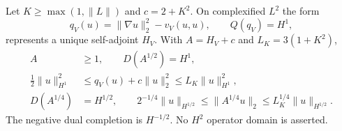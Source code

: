 \begin{proposition}
  \label{P:signed-closed-form}
  Let $K\ge\max(1,\|L\|)$ and $c=2+K^2$.
  On complexified $L^2$ the form
  \[
    q_V(u)=\|\nabla u\|_2^2-v_V(u,u),\qquad Q(q_V)=H^1,
  \]
  represents a unique self-adjoint $H_V$.
  With $A=H_V+c$ and $L_K=3(1+K^2)$,
  \begin{align}
    A&\ge1,\qquad D(A^{1/2})=H^1,\label{E:signed-form-domain}\\
    \tfrac12\|u\|_{H^1}^2
    &\le q_V(u)+c\|u\|_2^2\le L_K\|u\|_{H^1}^2,\label{E:signed-form-bounds}\\
    D(A^{1/4})&=H^{1/2},\qquad
    2^{-1/4}\|u\|_{H^{1/2}}
    \le\|A^{1/4}u\|_2\le L_K^{1/4}\|u\|_{H^{1/2}}.
    \label{E:signed-quarter-phase}
  \end{align}
  The negative dual completion is $H^{-1/2}$.
  No $H^2$ operator domain is asserted.
\end{proposition}

